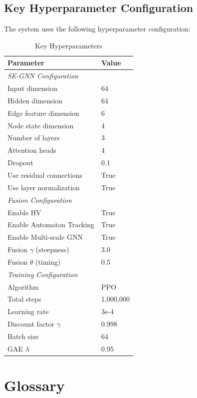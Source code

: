 \documentclass[conference]{IEEEtran}
\begin{document}
\subsection{Key Hyperparameter Configuration}

The system uses the following hyperparameter configuration:

\begin{table}[h]
\centering
\caption{Key Hyperparameters}
\begin{tabular}{@{}ll@{}}
\toprule
\textbf{Parameter} & \textbf{Value} \\ \midrule
\multicolumn{2}{l}{\textit{SE-GNN Configuration}} \\
Input dimension & 64 \\
Hidden dimension & 64 \\
Edge feature dimension & 6 \\
Node state dimension & 4 \\
Number of layers & 3 \\
Attention heads & 4 \\
Dropout & 0.1 \\
Use residual connections & True \\
Use layer normalization & True \\
\midrule
\multicolumn{2}{l}{\textit{Fusion Configuration}} \\
Enable HV & True \\
Enable Automaton Tracking & True \\
Enable Multi-scale GNN & True \\
Fusion $\gamma$ (steepness) & 3.0 \\
Fusion $\theta$ (timing) & 0.5 \\
\midrule
\multicolumn{2}{l}{\textit{Training Configuration}} \\
Algorithm & PPO \\
Total steps & 1,000,000 \\
Learning rate & 3e-4 \\
Discount factor $\gamma$ & 0.998 \\
Batch size & 64 \\
GAE $\lambda$ & 0.95 \\
\bottomrule
\end{tabular}
\end{table}

\section{Glossary}
\label{sec:appendix_b}
\end{document}
